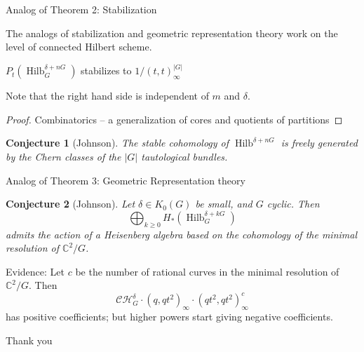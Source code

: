 \documentclass{beamer}
\DeclareMathOperator{\Hilb}{Hilb}
\newcommand{\C}{\mathbb{C}}
\newtheorem{conjecture}{Conjecture}
\begin{document}
\begin{frame}{Analog of Theorem 2: Stabilization}

The analogs of stabilization and geometric representation theory work on the level of connected Hilbert scheme.

\begin{Theorem}[Johnson] 
$P_t(\Hilb^{\delta+nG}_G)$ stabilizes to $1/(t,t)_\infty^{|G|}$
\end{Theorem}
Note that the right hand side is independent of $m$ and $\delta$.
\begin{proof} Combinatorics -- a generalization of cores and quotients of partitions \end{proof}

\begin{conjecture}[Johnson] 
The stable cohomology of $\Hilb^{\delta+nG}$ is freely generated by the Chern classes of the $|G|$ tautological bundles.
\end{conjecture}

\end{frame}

\begin{frame}{Analog of Theorem 3: Geometric Representation theory}


\begin{conjecture}[Johnson]
Let $\delta\in K_0(G)$ be small, and $G$ cyclic.  Then
$$\bigoplus_{k\geq 0} H_*(\Hilb^{\delta+kG}_G)$$ admits the action of a Heisenberg algebra based on the cohomology of the minimal resolution of $\C^2/G$.
\end{conjecture}
\begin{block}{Evidence:}
Let $c$ be the number of rational curves in the minimal resolution of $\C^2/G$.  Then
$$\mathcal{CH}^\delta_G\cdot(q,qt^2)_\infty\cdot (qt^2,qt^2)_\infty^c$$
has positive coefficients; but higher powers start giving negative coefficients.

\end{block}

\end{frame}






\begin{frame}[plain,c]

\begin{center}

\Huge

Thank you

\end{center}

\end{frame}
\end{document}
